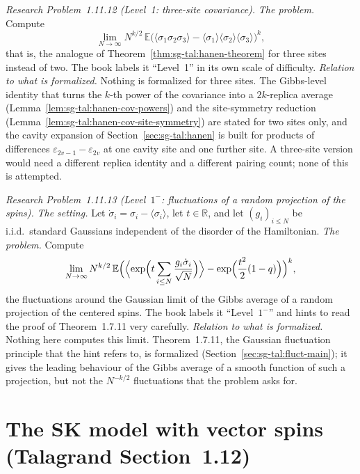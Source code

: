 \begin{remark}
\emph{Research Problem~1.11.12 (Level~1: three-site covariance).}
\emph{The problem.} Compute
\[
\lim_{N\to\infty}N^{k/2}\,\mathbb E\bigl(\langle\sigma_1\sigma_2\sigma_3\rangle-\langle\sigma_1\rangle\langle\sigma_2\rangle\langle\sigma_3\rangle\bigr)^k ,
\]
that is, the analogue of Theorem~\ref{thm:sg-tal:hanen-theorem} for three sites instead of two. The book labels it ``Level~1'' in its own scale of difficulty.
\emph{Relation to what is formalized.} Nothing is formalized for three sites. The Gibbs-level identity that turns the $k$-th power of the covariance into a $2k$-replica average (Lemma~\ref{lem:sg-tal:hanen-cov-powers}) and the site-symmetry reduction (Lemma~\ref{lem:sg-tal:hanen-cov-site-symmetry}) are stated for two sites only, and the cavity expansion of Section~\ref{sec:sg-tal:hanen} is built for products of differences $\varepsilon_{2v-1}-\varepsilon_{2v}$ at one cavity site and one further site. A three-site version would need a different replica identity and a different pairing count; none of this is attempted.

\emph{Research Problem~1.11.13 (Level~$1^-$: fluctuations of a random projection of the spins).}
\emph{The setting.} Let $\dot\sigma_i=\sigma_i-\langle\sigma_i\rangle$, let $t\in\mathbb R$, and let $(g_i)_{i\le N}$ be i.i.d.\ standard Gaussians independent of the disorder of the Hamiltonian.
\emph{The problem.} Compute
\[
\lim_{N\to\infty}N^{k/2}\,\mathbb E\Bigl(\Bigl\langle\exp\Bigl(t\sum_{i\le N}\frac{g_i\dot\sigma_i}{\sqrt N}\Bigr)\Bigr\rangle-\exp\Bigl(\frac{t^2}{2}(1-q)\Bigr)\Bigr)^k ,
\]
the fluctuations around the Gaussian limit of the Gibbs average of a random projection of the centered spins. The book labels it ``Level~$1^-$'' and hints to read the proof of Theorem~1.7.11 very carefully.
\emph{Relation to what is formalized.} Nothing here computes this limit. Theorem~1.7.11, the Gaussian fluctuation principle that the hint refers to, is formalized (Section~\ref{sec:sg-tal:fluct-main}); it gives the leading behaviour of the Gibbs average of a smooth function of such a projection, but not the $N^{-k/2}$ fluctuations that the problem asks for.
\end{remark}

\section{The SK model with vector spins (Talagrand Section~1.12)}\label{sec:sg-tal:vector}

